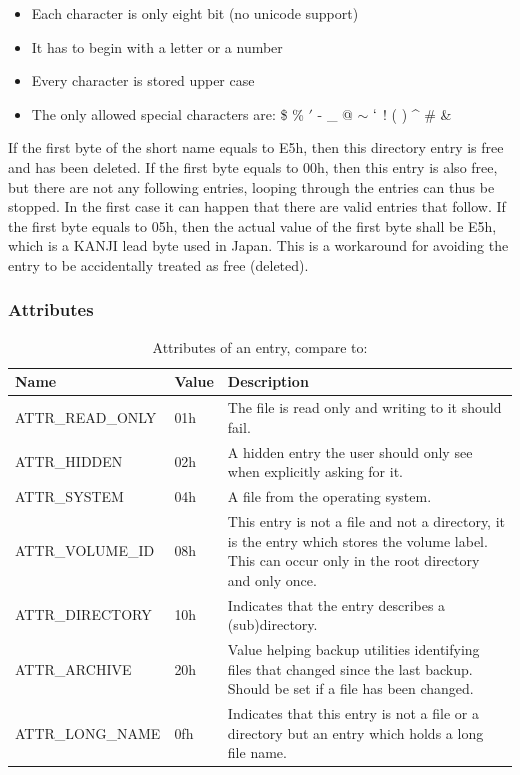 \begin{itemize}
\item Each character is only eight bit (no unicode support)
\item It has to begin with a letter or a number
\item Every character is stored upper case
\item The only allowed special characters are: \$ \% $'$ -  \_ @ $\sim$ $`$ ! ( ) { } \^{} \# \&
\end{itemize}

If the first byte of the short name equals to E5h, then this directory entry is free and has been deleted. If the first byte equals to 00h, then this entry is also free, but there are not any following entries, looping through the entries can thus be stopped. In the first case it can happen that there are valid entries that follow. If the first byte equals to 05h, then the actual value of the first byte shall be E5h, which is a KANJI lead byte used in Japan. This is a workaround for avoiding the entry to be accidentally treated as free (deleted)\cite{fatgen103}.

\subsubsection{Attributes}

\begin{table}[!ht]
\caption{Attributes of an entry, compare to: \cite{usb_ms_jan, fatgen103}}
\centering
\begin{tabular}{|l|l|p{9cm}|}
\hline\hline
\textbf{Name} & \textbf{Value}  & \textbf{Description}\\ \hline
ATTR\_READ\_ONLY & 01h & The file is read only and writing to it should fail. \\ \hline
ATTR\_HIDDEN & 02h & A hidden entry the user should only see when explicitly asking for it. \\ \hline
ATTR\_SYSTEM & 04h & A file from the operating system. \\ \hline
ATTR\_VOLUME\_ID & 08h & This entry is not a file and not a directory, it is the entry which stores the volume label. This can occur only in the root directory and only once. \\ \hline
ATTR\_DIRECTORY & 10h & Indicates that the entry describes a (sub)directory. \\ \hline
ATTR\_ARCHIVE & 20h & Value helping backup utilities identifying files that changed since the last backup. Should be set if a file has been changed. \\ \hline
ATTR\_LONG\_NAME & 0fh & Indicates that this entry is not a file or a directory but an entry which holds a long file name. \\ \hline
\end{tabular}
\label{table:fat_dir_entry_attr}
\end{table}

